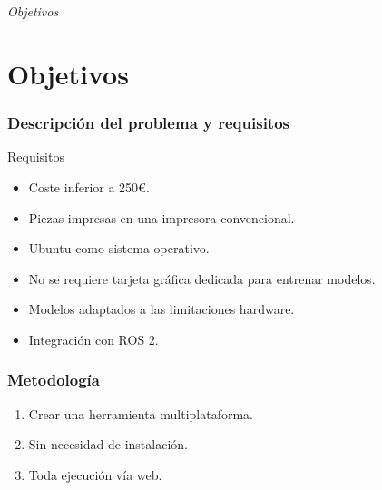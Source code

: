 \documentclass{beamer}
\begin{document}
\section*{}
\begin{frame}{}
  \centering \Huge
  \emph{Objetivos}
\end{frame}

\section{Objetivos}
\begin{frame}
\frametitle{Descripción del problema y requisitos}

	\begin{block}{Requisitos}
		\begin{itemize}
			\item Coste inferior a 250€.
			\item Piezas impresas en una impresora convencional.
			\item Ubuntu como sistema operativo.
			\item No se requiere tarjeta gráfica dedicada para entrenar modelos.
			\item Modelos adaptados a las limitaciones hardware.
			\item Integración con ROS 2.
		\end{itemize}
	\end{block}
\end{frame}

\begin{frame}
	\frametitle{Metodología}
	\begin{enumerate}
		\item Crear una herramienta multiplataforma.
		\item Sin necesidad de instalación.
		\item Toda ejecución vía web.
	\end{enumerate}
\end{frame}
\end{document}
